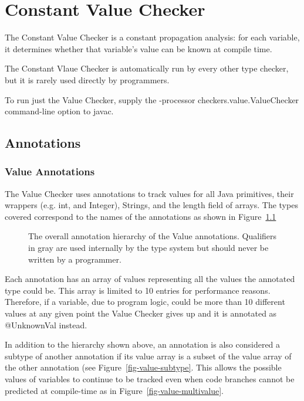 \htmlhr
\chapter{Constant Value Checker\label{value-checker}}

The Constant Value Checker is a constant propagation analysis: for
each variable, it determines whether that variable's value can be
known at compile time.


The Constant Vlaue Checker is automatically run by every other type
checker, but it is rarely used directly by programmers.

To run just the Value Checker, supply the -processor
checkers.value.ValueChecker command-line option to javac.

\section{Annotations}
\subsection{Value Annotations}

The Value Checker uses annotations to track values for all Java
primitives, their wrappers (e.g. int, and Integer), Strings, and the
length field of arrays. The types covered correspond to the names of
the annotations as shown in Figure~\ref{fig-value-hierarchy}

\begin{figure}
\caption{The overall annotation hierarchy of the Value
annotations. Qualifiers in gray are used
internally by the type system but should never be written by a
programmer.}
\label{fig-value-hierarchy}
\end{figure}

Each annotation has an array of values representing all the values the
annotated type could be. This array is limited to 10 entries for
performance reasons. Therefore, if a variable, due to program logic,
could be more than 10 different values at any given point the Value
Checker gives up and it is annotated as @UnknownVal instead.

In addition to the hierarchy shown above, an annotation is also
considered a subtype of another annotation if its value array is a
subset of the value array of the other annotation (see
Figure~\ref{fig-value-subtype}. This allows the possible values of
variables to continue to be tracked even when code branches cannot be
predicted at compile-time as in Figure~\ref{fig-value-multivalue}.

